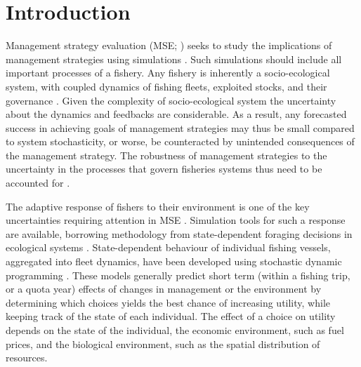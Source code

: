 \documentclass[12pt,oneline,a4paper,numbib]{ouparticle}
\numberwithin{equation}{subsection} %
\begin{document}
\maketitle

\section{Introduction}

Management strategy evaluation (MSE; \cite{Bunnefeld2011, Sainsbury2000, Smith1994}) seeks to study the implications of management strategies using simulations \cite{Punt2016}. Such simulations should include all important processes of a fishery. Any fishery is inherently a socio-ecological system, with coupled dynamics of fishing fleets, exploited stocks, and their governance \cite{Punt2016, Rasemeyer2007}. Given the complexity of socio-ecological system the uncertainty about the dynamics and feedbacks are considerable. As a result, any forecasted success in achieving goals of management strategies may thus be small compared to system stochasticity, or worse, be counteracted by unintended consequences of the management strategy. The robustness of management strategies to the uncertainty in the processes that govern fisheries systems thus need to be accounted for \cite{Andersen2010, Kell2007, Prellezo2016, Punt2016}. 

The adaptive response of fishers to their environment is one of the key uncertainties requiring attention in MSE \cite{Fulton2007}. Simulation tools for such a response are available, borrowing methodology from state-dependent foraging decisions in ecological systems \cite{ClarkandMangel2000,Houston1999}. State-dependent behaviour of individual fishing vessels, aggregated into fleet dynamics, have been developed using stochastic dynamic programming \cite{Alzorriz2018,Batsleer2015, Dowling2011, Poos2010, Gillis1995}. These models generally predict short term (within a fishing trip, or a quota year) effects of changes in management or the environment by determining which choices yields the best chance of increasing utility, while keeping track of the state of each individual. The effect of a choice on utility depends on the state of the individual, the economic environment, such as fuel prices, and the biological environment, such as the spatial distribution of resources. 
\end{document}
